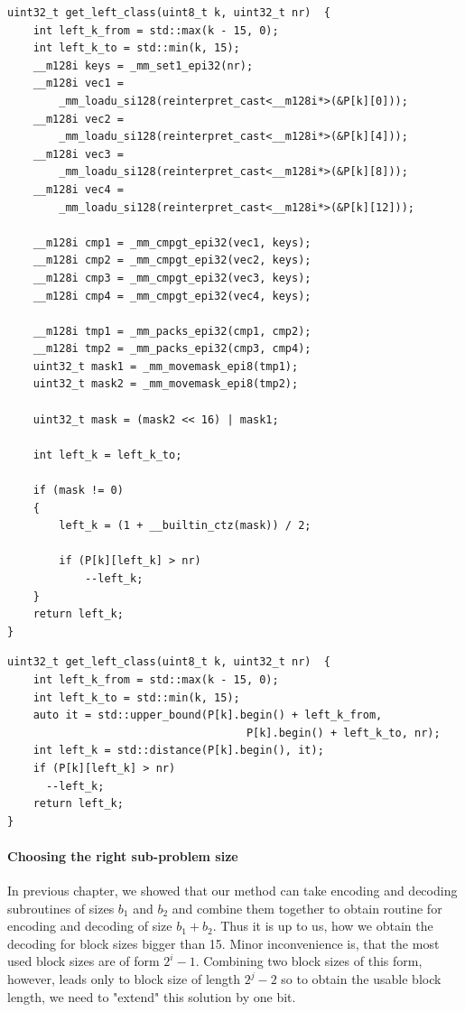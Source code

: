 \begin{lstlisting}
uint32_t get_left_class(uint8_t k, uint32_t nr)  {
	int left_k_from = std::max(k - 15, 0);
	int left_k_to = std::min(k, 15);
	__m128i keys = _mm_set1_epi32(nr);
	__m128i vec1 =
		_mm_loadu_si128(reinterpret_cast<__m128i*>(&P[k][0]));
	__m128i vec2 =
		_mm_loadu_si128(reinterpret_cast<__m128i*>(&P[k][4]));
	__m128i vec3 =
		_mm_loadu_si128(reinterpret_cast<__m128i*>(&P[k][8]));
	__m128i vec4 =
		_mm_loadu_si128(reinterpret_cast<__m128i*>(&P[k][12]));

	__m128i cmp1 = _mm_cmpgt_epi32(vec1, keys);
	__m128i cmp2 = _mm_cmpgt_epi32(vec2, keys);
	__m128i cmp3 = _mm_cmpgt_epi32(vec3, keys);
	__m128i cmp4 = _mm_cmpgt_epi32(vec4, keys);

	__m128i tmp1 = _mm_packs_epi32(cmp1, cmp2);
	__m128i tmp2 = _mm_packs_epi32(cmp3, cmp4);
	uint32_t mask1 = _mm_movemask_epi8(tmp1);
	uint32_t mask2 = _mm_movemask_epi8(tmp2);

	uint32_t mask = (mask2 << 16) | mask1;

	int left_k = left_k_to;

	if (mask != 0)
	{
		left_k = (1 + __builtin_ctz(mask)) / 2;

		if (P[k][left_k] > nr)
			--left_k;
	}
	return left_k;
}
\end{lstlisting}

\begin{lstlisting}
uint32_t get_left_class(uint8_t k, uint32_t nr)  {
	int left_k_from = std::max(k - 15, 0);
	int left_k_to = std::min(k, 15);
	auto it = std::upper_bound(P[k].begin() + left_k_from,
                                     P[k].begin() + left_k_to, nr);
    int left_k = std::distance(P[k].begin(), it);
    if (P[k][left_k] > nr)
      --left_k;
	return left_k;
}
\end{lstlisting}

\paragraph{Choosing the right sub-problem size}

In previous chapter, we showed that our method can take encoding and decoding subroutines
of sizes $b_1$ and $b_2$ and combine them together to obtain routine for encoding and
decoding of size $b_1+b_2$. Thus it is up to us, how we obtain the decoding for block sizes
bigger than 15. Minor inconvenience is, that the most used block sizes are of form $2^i-1$.
Combining two block sizes of this form, however, leads only to block size of length $2^j-2$
so to obtain the usable block length, we need to "extend" this solution by one bit.

